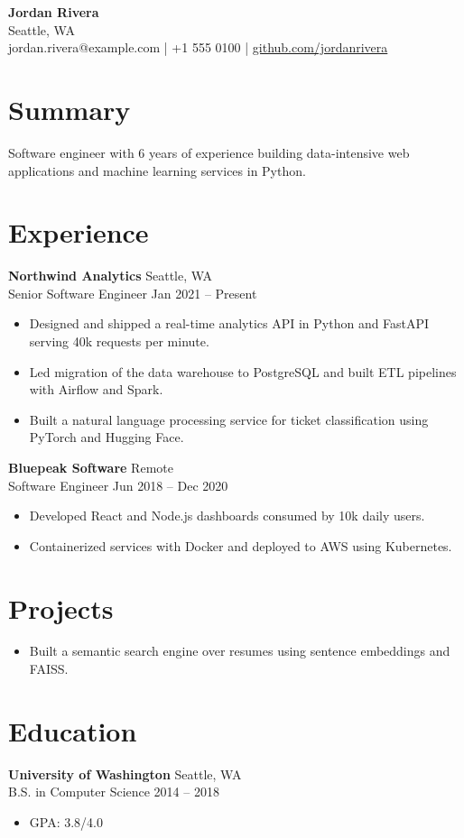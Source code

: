 \documentclass[11pt,a4paper]{article}
\newcommand{\resumeSubheading}[4]{\textbf{#1} \hfill #2 \\ #3 \hfill #4}
\newcommand{\resumeItem}[1]{\item #1}
\begin{document}
\begin{center}
\textbf{\Large Jordan Rivera} \\
Seattle, WA \\
jordan.rivera@example.com | +1 555 0100 | \href{https://github.com/jordanrivera}{github.com/jordanrivera}
\end{center}

\section*{Summary}
Software engineer with 6 years of experience building data-intensive web applications and machine learning services in Python.

\section*{Experience}
\resumeSubheading{Northwind Analytics}{Seattle, WA}{Senior Software Engineer}{Jan 2021 -- Present}
\begin{itemize}
  \resumeItem{Designed and shipped a real-time analytics API in Python and FastAPI serving 40k requests per minute.}
  \resumeItem{Led migration of the data warehouse to PostgreSQL and built ETL pipelines with Airflow and Spark.}
  \resumeItem{Built a natural language processing service for ticket classification using PyTorch and Hugging Face.}
\end{itemize}

\resumeSubheading{Bluepeak Software}{Remote}{Software Engineer}{Jun 2018 -- Dec 2020}
\begin{itemize}
  \resumeItem{Developed React and Node.js dashboards consumed by 10k daily users.}
  \resumeItem{Containerized services with Docker and deployed to AWS using Kubernetes.}
\end{itemize}

\section*{Projects}
\begin{itemize}
  \resumeItem{Built a semantic search engine over resumes using sentence embeddings and FAISS.}
\end{itemize}

\section*{Education}
\resumeSubheading{University of Washington}{Seattle, WA}{B.S. in Computer Science}{2014 -- 2018}
\begin{itemize}
  \resumeItem{GPA: 3.8/4.0}
\end{itemize}
\end{document}
